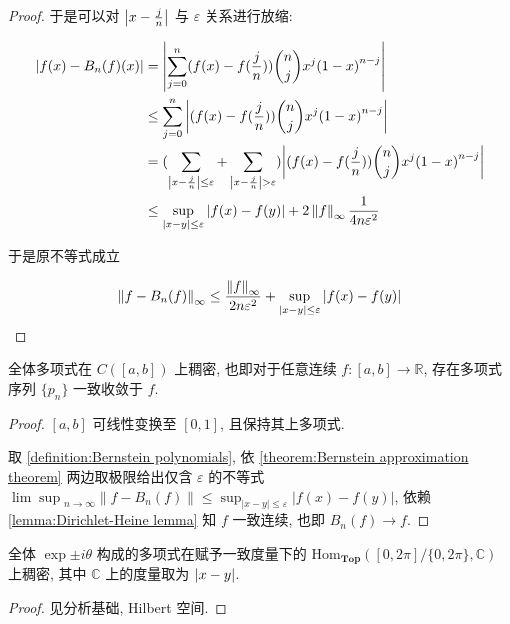 \begin{theorem}
\begin{proof}
        于是可以对 \(\abs{x - \frac{j}{n}}\) 与 \(\varepsilon\) 关系进行放缩:

        \[
            \begin{aligned}
                \abs{f(x) - B_n(f)(x)} &= \abs {\sum_{j = 0}^{n} (f(x) - f(\frac{j}{n})) \binom{n}{j} x^j {(1-x)}^{n-j}} \\
                &\leq \sum_{j = 0}^{n} \abs {(f(x) - f(\frac{j}{n})) \binom{n}{j} x^j {(1-x)}^{n-j}} \\
                &= (\sum_{\abs{x - \frac{j}{n}} \leq \varepsilon} + \sum_{\abs{x - \frac{j}{n}} > \varepsilon}) \abs {(f(x) - f(\frac{j}{n})) \binom{n}{j} x^j {(1-x)}^{n-j}} \\
                &\leq \sup_{\abs{x-y} \leq \varepsilon} \abs{f(x) - f(y)} + 2 \left\|f\right\|_\infty \frac{1}{4n\varepsilon^2} \\
            \end{aligned}
        \]

        于是原不等式成立

        \[
            \left\| f - B_n(f) \right\|_\infty \leq \frac{\left\| f \right\|_\infty}{2 n \varepsilon^2} + \sup_{\left|x-y\right| \leq \varepsilon} \abs {f(x) - f(y)}
        \]
    \end{proof}
\end{theorem}

\begin{theorem}
    \label{theorem:weierstrass' first theorem}
    全体多项式在 \(C([a,b])\) 上稠密, 也即对于任意连续 \(f : [a,b] \to \mathbb{R}\), 存在多项式序列 \(\{p_n\}\) 一致收敛于 \(f\).

    \begin{proof}
        \([a,b]\) 可线性变换至 \([0,1]\), 且保持其上多项式.

        取 \ref{definition:Bernstein polynomials}, 依 \ref{theorem:Bernstein approximation theorem} 两边取极限给出仅含 \(\varepsilon\) 的不等式 \({\lim \sup}_{n \to \infty} \left\| f - B_n(f) \right\| \leq \sup_{\left| x-y \right| \leq \varepsilon} \left|f(x) - f(y)\right|\),
        依赖 \ref{lemma:Dirichlet-Heine lemma} 知 \(f\) 一致连续, 也即 \(B_n(f) \to f\).
    \end{proof}
\end{theorem}

\begin{theorem}
    \label {theorem:weierstrass' second theorem another}
    全体 \(\exp {\pm i \theta}\) 构成的多项式在赋予一致度量下的 \(\mathrm{Hom}_{\mathbf{Top}} ([0,2\pi]/\{0,2\pi\},\mathbb{C})\) 上稠密, 其中 \(\mathbb{C}\) 上的度量取为 \(\abs {x - y}\).

    \begin{proof}
        见分析基础, Hilbert 空间.
    \end{proof}
\end{theorem}

